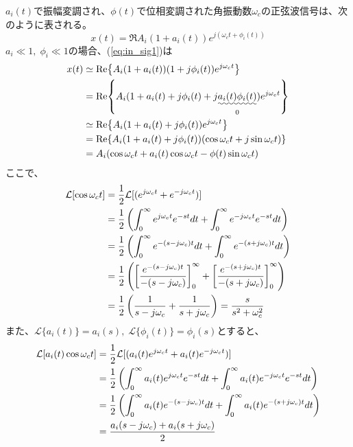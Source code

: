 \documentclass[book]{jlreq}
\begin{document}
$a_i(t)$で振幅変調され、$\phi(t)$で位相変調された角振動数$\omega_c$の正弦波信号は、次のように表される。
%
\begin{equation}
    x(t) = \Re{A_i(1+a_i(t))e^{j(\omega_c t+\phi_i(t))}}
    \label{eq:in_sig1}
\end{equation}
%
$a_i \ll 1,\; \phi_i \ll 1$の場合、(\ref{eq:in_sig1})は
%
\begin{align}
    x(t) & \simeq \Re{A_i(1 + a_i(t))(1 + j\phi_i(t))e^{j\omega_c t}}                                \notag   \\
         & = \Re{A_i(1 + a_i(t) + j\phi_i(t) + j\underset{0}{\uwave{a_i(t)\phi_i(t)}})e^{j\omega_c t}} \notag \\
         & \simeq \Re{A_i(1 + a_i(t) + j\phi_i(t))e^{j\omega_c t}}\notag                                      \\
         & = \Re{A_i(1 + a_i(t) + j\phi_i(t))(\cos\omega_c t + j\sin\omega_c t)} \notag                       \\
         & = A_i(\cos\omega_c t + a_i(t)\cos\omega_c t - \phi(t)\sin\omega_c t)
    \label{eq:in_sig2}
\end{align}
%
ここで、
%
\begin{align}
    \mathcal{L} [\cos\omega_c t]
     & = \frac{1}{2}\mathcal{L}[(e^{j\omega_c t}+e^{-j\omega_c t})]\notag                                                    \\
     & = \frac{1}{2}\left(\int_0^\infty e^{j\omega_c t} e^{-st} dt + \int_0^\infty e^{-j\omega_c t} e^{-st} dt \right)\notag \\
     & = \frac{1}{2}\left(\int_0^\infty e^{-(s-j\omega_c) t} dt + \int_0^\infty e^{-(s+j\omega_c) t} dt \right)\notag        \\
     & = \frac{1}{2}\left(\left[\frac{e^{-(s-j\omega_c) t}}{-(s-j\omega_c)}\right]_0^\infty +
    \left[\frac{e^{-(s+j\omega_c) t}}{-(s+j\omega_c)}\right]_0^\infty \right)\notag                                          \\
     & = \frac{1}{2}\left( \frac{1}{s-j\omega_c}+\frac{1}{s+j\omega_c}\right)
    = \frac{s}{s^2+\omega_c^2}
\end{align}
%
また、$\mathcal{L}\{a_i(t)\} = a_i(s),\; \mathcal{L}\{\phi_i(t)\} = \phi_i(s)$とすると、
%
\begin{align}
    \mathcal{L} [a_i(t)\cos\omega_c t]
     & = \frac{1}{2}\mathcal{L}[(a_i(t) e^{j\omega_c t}+a_i(t) e^{-j\omega_c t})]\notag                                                    \\
     & = \frac{1}{2}\left(\int_0^\infty a_i(t) e^{j\omega_c t} e^{-st} dt + \int_0^\infty a_i(t) e^{-j\omega_c t} e^{-st} dt \right)\notag \\
     & = \frac{1}{2}\left(\int_0^\infty a_i(t) e^{-(s-j\omega_c) t} dt + \int_0^\infty a_i(t) e^{-(s+j\omega_c) t} dt \right)\notag        \\
     & = \frac{a_i(s-j\omega_c) + a_i(s+j\omega_c)}{2}
\end{align}
\end{document}
